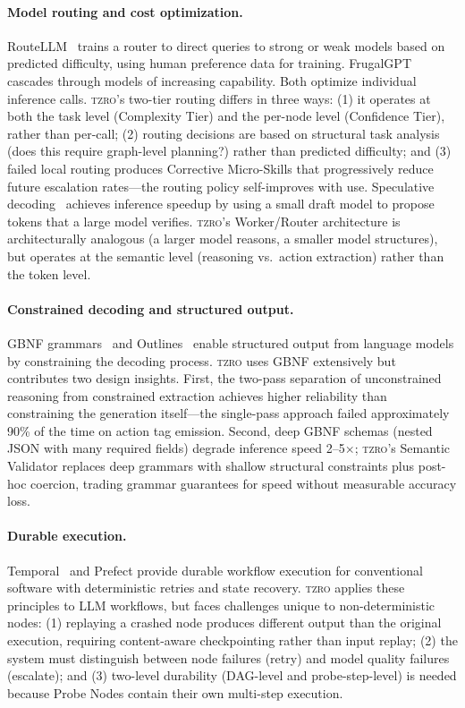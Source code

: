 \documentclass{article}
\begin{document}
\paragraph{Model routing and cost optimization.}
RouteLLM~\cite{routellm2024} trains a router to direct queries to strong or weak models based on predicted difficulty, using human preference data for training.
FrugalGPT~\cite{frugalgpt2023} cascades through models of increasing capability.
Both optimize individual inference calls.
\textsc{tzro}'s two-tier routing differs in three ways: (1) it operates at both the task level (Complexity Tier) and the per-node level (Confidence Tier), rather than per-call; (2) routing decisions are based on structural task analysis (does this require graph-level planning?) rather than predicted difficulty; and (3) failed local routing produces Corrective Micro-Skills that progressively reduce future escalation rates---the routing policy self-improves with use.
Speculative decoding~\cite{speculative2023} achieves inference speedup by using a small draft model to propose tokens that a large model verifies.
\textsc{tzro}'s Worker/Router architecture is architecturally analogous (a larger model reasons, a smaller model structures), but operates at the semantic level (reasoning vs.\ action extraction) rather than the token level.

\paragraph{Constrained decoding and structured output.}
GBNF grammars~\cite{ggerganov_llamacpp} and Outlines~\cite{outlines2024} enable structured output from language models by constraining the decoding process.
\textsc{tzro} uses GBNF extensively but contributes two design insights.
First, the two-pass separation of unconstrained reasoning from constrained extraction achieves higher reliability than constraining the generation itself---the single-pass approach failed approximately 90\% of the time on action tag emission.
Second, deep GBNF schemas (nested JSON with many required fields) degrade inference speed 2--5$\times$; \textsc{tzro}'s Semantic Validator replaces deep grammars with shallow structural constraints plus post-hoc coercion, trading grammar guarantees for speed without measurable accuracy loss.

\paragraph{Durable execution.}
Temporal~\cite{temporal2022} and Prefect provide durable workflow execution for conventional software with deterministic retries and state recovery.
\textsc{tzro} applies these principles to LLM workflows, but faces challenges unique to non-deterministic nodes: (1) replaying a crashed node produces different output than the original execution, requiring content-aware checkpointing rather than input replay; (2) the system must distinguish between node failures (retry) and model quality failures (escalate); and (3) two-level durability (DAG-level and probe-step-level) is needed because Probe Nodes contain their own multi-step execution.
\end{document}
